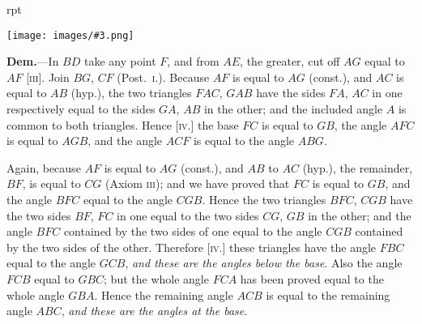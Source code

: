 \documentclass[oneside]{book}
\newcounter{wrapwidth}
\newcommand\imgflow[3]{
\setcounter{wrapwidth}{#1}
\begin{wrapfigure}[#2]{r}{\value{wrapwidth}pt}
\begin{center}
\vspace{-0.3in}
\texttt{[image: images/\#3.png]}
\end{center}
\end{wrapfigure}
}
\begin{document}
\imgflow{128}{12}{f016}

\textbf{Dem.}---In $BD$ take any point $F$, and from $AE$, the
greater, cut off $AG$ equal to
$AF$ [\textsc{iii}]. Join $BG$, $CF$
(Post.~\textsc{i.}). Because $AF$ is
equal to $AG$ (const.), and $AC$
is equal to $AB$ (hyp.), the
two triangles $FAC$, $GAB$
have the sides $FA$, $AC$ in
one respectively equal to the
sides $GA$, $AB$ in the other;
and the included angle $A$ is
common to both triangles.
Hence [\textsc{iv.}] the base $FC$ is
equal to $GB$, the angle $AFC$ is equal to $AGB$, and the
angle $ACF$ is equal to the angle $ABG$.

Again, because $AF$ is equal to $AG$ (const.), and $AB$
to $AC$ (hyp.), the remainder, $BF$, is equal to $CG$ (Axiom
\textsc{iii}); and we have proved that $FC$ is equal to $GB$, and
the angle $BFC$ equal to the angle $CGB$. Hence the
two triangles $BFC$, $CGB$ have the two sides $BF$, $FC$ in
one equal to the two sides $CG$, $GB$ in the other; and the
angle $BFC$ contained by the two sides of one equal to the
angle $CGB$ contained by the two sides of the other.
Therefore [\textsc{iv.}] these triangles have the angle $FBC$
equal to the angle $GCB$, \emph{and these are the angles below
the base}. Also the angle $FCB$ equal to $GBC$; but the
whole angle $FCA$ has been proved equal to the whole
angle $GBA$. Hence the remaining angle $ACB$ is equal
to the remaining angle $ABC$, \emph{and these are the angles
at the base}.
\end{document}
